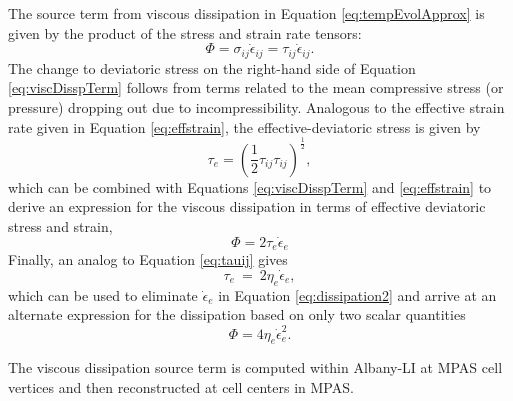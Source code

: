 The source term from viscous dissipation in Equation \ref{eq:tempEvolApprox} is given by the product of the stress and strain rate tensors:
\begin{equation}
  \label{eq:viscDisspTerm}
	\Phi=\sigma_{ij} \dot{\epsilon}_{ij} = \tau_{ij} \dot{\epsilon}_{ij}.
    \end{equation}
%
The change to deviatoric stress on the right-hand side of Equation \ref{eq:viscDisspTerm} follows from terms related to the mean compressive stress (or pressure) dropping out due to incompressibility. Analogous to the effective strain rate given in Equation \ref{eq:effstrain}, the effective-deviatoric stress is given by
%
\begin{equation}
\tau_{e}=\left(\frac{1}{2}\tau_{ij}\tau_{ij}\right)^{\frac{1}{2}},
\label{eq:effstress}
\end{equation}
%
which can be combined with Equations \ref{eq:viscDisspTerm} and \ref{eq:effstrain} to derive an expression for the viscous dissipation in terms of effective deviatoric stress and strain,
%
\begin{equation}
  \label{eq:dissipation2}
  \Phi = 2 {{\tau}_e}{\dot{{\epsilon}}_e}
\end{equation}
%
Finally, an analog to Equation \ref{eq:tauij} gives
%
\begin{equation}
\tau_{e}~=~2 \eta_{e} \dot{\epsilon}_{e},
\label{eq:taue}
\end{equation}
%
which can be used to eliminate $\dot{\epsilon}_{e}$ in Equation \ref{eq:dissipation2} and arrive at an alternate expression for the dissipation based on only two scalar quantities 
%
\begin{equation}
  \label{eq:dissipation3}
  \Phi = 4 {\eta_{e}}  \dot{\epsilon}_{e}^2.
\end{equation}

The viscous dissipation source term is computed within Albany-LI at MPAS cell vertices and then reconstructed at cell centers in MPAS.




